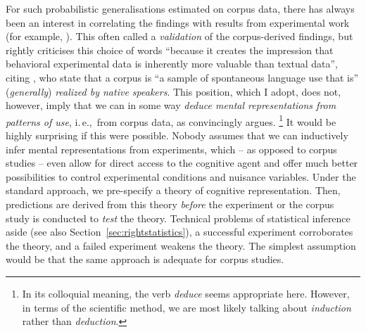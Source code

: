 \documentclass[USenglish]{article}
\newcommand{\ie}{i.\,e.,}
\begin{document}
For such probabilistic generalisations estimated on corpus data, there has always been an interest in correlating the findings with results from experimental work (for example, \citealp{ArppeJaervikivi2007,BresnanEa2007,BresnanFord2010,DivjakGries2008,DivjakEa2016,FordBresnan2013}).
This often called a \textit{validation} of the corpus-derived findings, but \citet[303]{Divjak2016a} rightly criticises this choice of words ``because it creates the impression that behavioral experimental data is inherently more valuable than textual data'', citing \cite{TummersEa2005}, who state that a corpus is ``a sample of spontaneous language use that is'' (\textit{generally}) \textit{realized by native speakers}.
This position, which I adopt, does not, however, imply that we can in some way \textit{deduce mental representations from patterns of use}, \ie\ from corpus data, as  \citet[486--487]{Dabrowska2016} convincingly argues.%
\footnote{In its colloquial meaning, the verb \textit{deduce} seems appropriate here.
However, in terms of the scientific method, we are most likely talking about \textit{induction} rather than \textit{deduction}.}
It would be highly surprising if this were possible.
Nobody assumes that we can inductively infer mental representations from experiments, which -- as opposed to corpus studies -- even allow for direct access to the cognitive agent and offer much better possibilities to control experimental conditions and nuisance variables.
Under the standard approach, we pre-specify a theory of cognitive representation.
Then, predictions are derived from this theory \textit{before} the experiment or the corpus study is conducted to \textit{test} the theory.
Technical problems of statistical inference aside (see also Section~\ref{sec:rightstatistics}), a successful experiment corroborates the theory, and a failed experiment weakens the theory.
The simplest assumption would be that the same approach is adequate for corpus studies.
\end{document}

